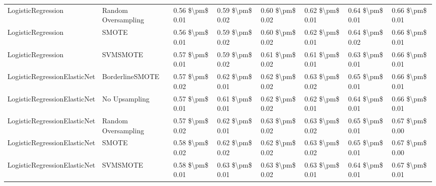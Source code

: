 \begin{tabular}{llllllll}
             LogisticRegression &           Random Oversampling & 0.56 \$\textbackslash pm\$ 0.01 &           0.59 \$\textbackslash pm\$ 0.02 &       0.60 \$\textbackslash pm\$ 0.02 &        0.62 \$\textbackslash pm\$ 0.01 &                         0.64 \$\textbackslash pm\$ 0.01 &     0.66 \$\textbackslash pm\$ 0.01 \\
             LogisticRegression &                         SMOTE & 0.56 \$\textbackslash pm\$ 0.01 &           0.59 \$\textbackslash pm\$ 0.02 &       0.60 \$\textbackslash pm\$ 0.02 &        0.62 \$\textbackslash pm\$ 0.01 &                         0.64 \$\textbackslash pm\$ 0.02 &     0.66 \$\textbackslash pm\$ 0.01 \\
             LogisticRegression &                      SVMSMOTE & 0.57 \$\textbackslash pm\$ 0.01 &           0.59 \$\textbackslash pm\$ 0.02 &       0.61 \$\textbackslash pm\$ 0.02 &        0.61 \$\textbackslash pm\$ 0.01 &                         0.63 \$\textbackslash pm\$ 0.01 &     0.66 \$\textbackslash pm\$ 0.01 \\
   LogisticRegressionElasticNet &               BorderlineSMOTE & 0.57 \$\textbackslash pm\$ 0.02 &           0.62 \$\textbackslash pm\$ 0.01 &       0.62 \$\textbackslash pm\$ 0.02 &        0.63 \$\textbackslash pm\$ 0.02 &                         0.65 \$\textbackslash pm\$ 0.01 &     0.66 \$\textbackslash pm\$ 0.01 \\
   LogisticRegressionElasticNet &                 No Upsampling & 0.57 \$\textbackslash pm\$ 0.01 &           0.61 \$\textbackslash pm\$ 0.01 &       0.62 \$\textbackslash pm\$ 0.02 &        0.62 \$\textbackslash pm\$ 0.01 &                         0.64 \$\textbackslash pm\$ 0.01 &     0.66 \$\textbackslash pm\$ 0.01 \\
   LogisticRegressionElasticNet &           Random Oversampling & 0.57 \$\textbackslash pm\$ 0.02 &           0.62 \$\textbackslash pm\$ 0.01 &       0.63 \$\textbackslash pm\$ 0.02 &        0.63 \$\textbackslash pm\$ 0.02 &                         0.65 \$\textbackslash pm\$ 0.01 &     0.67 \$\textbackslash pm\$ 0.00 \\
   LogisticRegressionElasticNet &                         SMOTE & 0.58 \$\textbackslash pm\$ 0.02 &           0.62 \$\textbackslash pm\$ 0.02 &       0.62 \$\textbackslash pm\$ 0.02 &        0.63 \$\textbackslash pm\$ 0.02 &                         0.65 \$\textbackslash pm\$ 0.01 &     0.67 \$\textbackslash pm\$ 0.00 \\
   LogisticRegressionElasticNet &                      SVMSMOTE & 0.58 \$\textbackslash pm\$ 0.01 &           0.63 \$\textbackslash pm\$ 0.01 &       0.63 \$\textbackslash pm\$ 0.02 &        0.63 \$\textbackslash pm\$ 0.01 &                         0.64 \$\textbackslash pm\$ 0.01 &     0.67 \$\textbackslash pm\$ 0.01 \\

\end{tabular}
